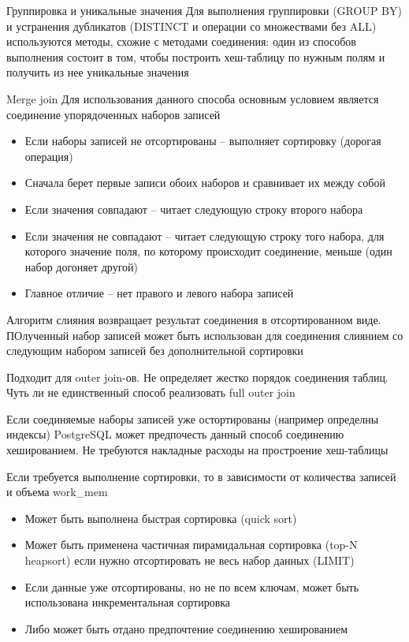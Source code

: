 \documentclass[12pt]{article}
\begin{document}
\begin{nota}{Группировка и уникальные значения}
    Для выполнения группировки (GROUP BY) и устранения дубликатов (DISTINCT и операции со множествами без ALL) используются методы, схожие с методами соединения: один из способов выполнения состоит в том, чтобы построить хеш-таблицу по нужным полям и получить из нее уникальные значения
\end{nota}

\begin{defin}{Merge join}
    Для использования данного способа основным условием является соединение упорядоченных наборов записей

    \begin{itemize}
        \item Если наборы записей не отсортированы -- выполняет сортировку (дорогая операция)
        \item Сначала берет первые записи обоих наборов и сравнивает их между собой 
        \item Если значения совпадают -- читает следующую строку второго набора 
        \item Если значения не совпадают -- читает следующую строку того набора, для которого значение поля, по которому происходит соединение, меньше (один набор догоняет другой)
        \item Главное отличие -- нет правого и левого набора записей 
    \end{itemize}

    Алгоритм слияния возвращает результат соединения в отсортированном виде. ПОлученный набор записей может быть использован для соединения слиянием со следующим набором записей без дополнительной сортировки

    Подходит для outer join-ов. Не определяет жестко порядок соединения таблиц. Чуть ли не единственный способ реализовать full outer join 

    Если соединяемые наборы записей уже остортированы (например определны индексы) PostgreSQL может предпочесть данный способ соединению хешированием. Не требуются накладные расходы на простроение хеш-таблицы 

    Если требуется выполнение сортировки, то в зависимости от количества записей и объема work\_mem 

    \begin{itemize}
        \item Может быть выполнена быстрая сортировка (quick sort)
        \item Может быть применена частичная пирамидальная сортировка (top-N heapsort) если нужно отсортировать не весь набор данных (LIMIT)
        \item Если данные уже отсортированы, но не по всем ключам, может быть использована инкрементальная сортировка 
        \item Либо может быть отдано предпочтение соединению хешированием 
    \end{itemize}
\end{defin}
\end{document}

